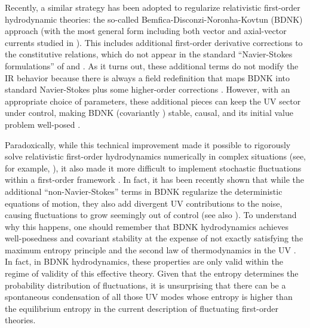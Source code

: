\documentclass[a4paper, amsfonts, amssymb, amsmath, reprint, showkeys, nofootinbib, twoside,notitlepage,onecolumn,preprintnumbers]{revtex4-2}
\theoremstyle{definition}
\theoremstyle{theorem}
\theoremstyle{corollary}
\begin{document}
Recently, a similar strategy has been adopted to regularize relativistic first-order hydrodynamic theories: the so-called Bemfica-Disconzi-Noronha-Kovtun (BDNK) approach \cite{Bemfica2017TheFirst,Kovtun2019,Bemfica2019_conformal1,Hoult:2020eho,BemficaDNDefinitivo2020} (with the most general form including both vector and axial-vector currents studied in \cite{Abboud:2023hos}). This includes additional first-order derivative corrections to the constitutive relations, which do not appear in the standard ``Navier-Stokes formulations'' of \citet{Eckart40} and \citet{landau6}. As it turns out, these additional terms do not modify the IR behavior because there is always a field redefinition that maps BDNK into standard Navier-Stokes plus some higher-order corrections \cite{Kovtun2019}. However, with an appropriate choice of parameters, these additional pieces can keep the UV sector under control, making BDNK (covariantly \cite{GavassinoBounds2023}) stable, causal, and its initial value problem well-posed \cite{BemficaDNDefinitivo2020}.

Paradoxically, while this technical improvement made it possible to rigorously solve relativistic first-order hydrodynamics numerically in complex situations (see, for example, \cite{Pandya:2021ief,Pandya:2022pif,Pandya:2022sff}), it also made it more difficult to implement stochastic fluctuations within a first-order framework \cite{Abbasi:2022rum,Mullins:2023ott,Jain:2023obu}. In fact, it has been recently shown that while the additional ``non-Navier-Stokes'' terms in BDNK regularize the deterministic equations of motion, they also add divergent UV contributions to the noise, causing fluctuations to grow seemingly out of control \cite{Mullins:2023ott} (see also  \cite{Jain:2023obu}). To understand why this happens, one should remember that BDNK hydrodynamics achieves well-posedness and covariant stability at the expense of not exactly satisfying the maximum entropy principle and the second law of thermodynamics in the UV \cite{GavassinoLyapunov_2020,DoreGavassino2022}. In fact, in BDNK hydrodynamics, these properties are only valid within the regime of validity of this effective theory. Given that the entropy determines the probability distribution of fluctuations, it is unsurprising that there can be a spontaneous condensation of all those UV modes whose entropy is higher than the equilibrium entropy in the current description of fluctuating first-order theories.
\end{document}
